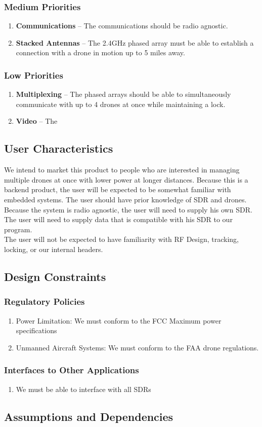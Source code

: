 \documentclass[ProjectRequirements.tex]{subfiles}
\begin{document}
		\subsubsection{Medium Priorities}
			\begin{enumerate}
				\item \textbf{Communications} -- The communications should be radio agnostic.
				\item \textbf{Stacked Antennas} -- The 2.4GHz phased array must be able to establish a connection with a drone in motion up to 5 miles away.
			\end{enumerate}
		
		\subsubsection{Low Priorities}
			\begin{enumerate}
				\item \textbf{Multiplexing} -- The phased arrays should be able to simultaneously communicate with up to 4 drones at once while maintaining a lock.
				\item \textbf{Video} -- The 
			\end{enumerate}
		
	\subsection{User Characteristics}
		We intend to market this product to people who are interested in managing multiple drones at once with lower power at longer distances. Because this is a backend product, the user will be expected to be somewhat familiar with embedded systems. The user should have prior knowledge of SDR and drones. Because the system is radio agnostic, the user will need to supply his own SDR. The user will need to supply data that is compatible with his SDR to our program.\\
		
		The user will not be expected to have familiarity with RF Design, tracking, locking, or our internal headers.
		
	\subsection{Design Constraints}
		\subsubsection{Regulatory Policies}
			\begin{enumerate}
				\item Power Limitation: We must conform to the FCC Maximum power specifications
				\item Unmanned Aircraft Systems: We must conform to the FAA drone regulations.
			\end{enumerate}
		\subsubsection{Interfaces to Other Applications}
			\begin{enumerate}
				\item We must be able to interface with all SDRs
				
			\end{enumerate}

		
	\subsection{Assumptions and Dependencies}
	
\end{document}
